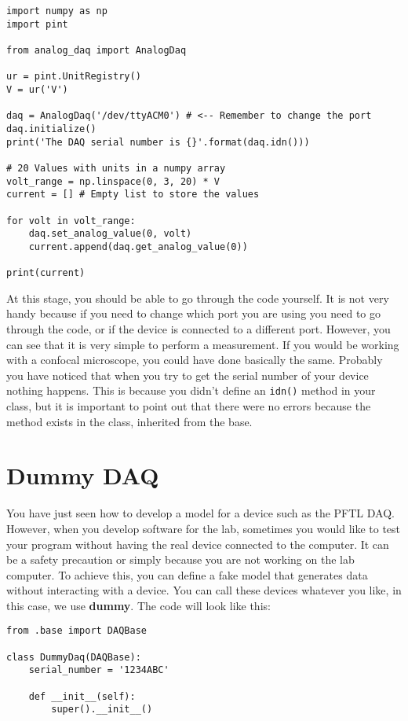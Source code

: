 \begin{verbatim}
import numpy as np
import pint

from analog_daq import AnalogDaq

ur = pint.UnitRegistry()
V = ur('V')

daq = AnalogDaq('/dev/ttyACM0') # <-- Remember to change the port
daq.initialize()
print('The DAQ serial number is {}'.format(daq.idn()))

# 20 Values with units in a numpy array
volt_range = np.linspace(0, 3, 20) * V 
current = [] # Empty list to store the values

for volt in volt_range:
    daq.set_analog_value(0, volt)
    current.append(daq.get_analog_value(0))

print(current)
\end{verbatim}

At this stage, you should be able to go through the code yourself. It is
not very handy because if you need to change which port you are using
you need to go through the code, or if the device is connected to a
different port. However, you can see that it is very simple to perform a
measurement. If you would be working with a confocal microscope, you
could have done basically the same. Probably you have noticed that when
you try to get the serial number of your device nothing happens. This is
because you didn't define an \texttt{idn()} method in your class, but it
is important to point out that there were no errors because the method
exists in the class, inherited from the base.


\section{Dummy DAQ}\label{dummy-daq}
You have just seen how to develop a model for a device such as the
{PFTL} {DAQ}. However, when you develop software for the lab, sometimes
you would like to test your program without having the real device
connected to the computer. It can be a safety precaution or simply
because you are not working on the lab computer. To achieve this, you
can define a fake model that generates data without interacting with a
device. You can call these devices whatever you like, in this case, we
use \textbf{dummy}. The code will look like this:

\begin{verbatim}
from .base import DAQBase

class DummyDaq(DAQBase):
    serial_number = '1234ABC'
    
    def __init__(self):
        super().__init__()
\end{verbatim}

